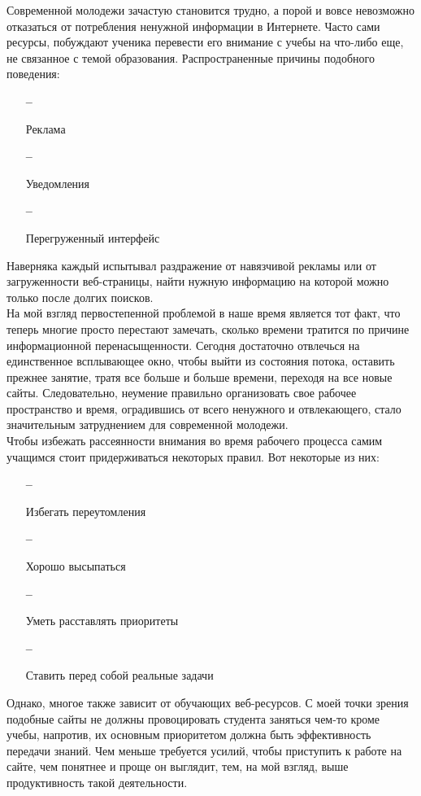 \documentclass[a4paper, 12pt]{extarticle}
\begin{document}
Современной молодежи зачастую становится трудно, а порой и вовсе невозможно
отказаться от потребления ненужной информации в Интернете. Часто сами ресурсы,
побуждают ученика перевести его внимание с учебы на что-либо еще, не связанное
с темой образования. Распространенные причины подобного поведения:
\begin{itemize}
    \item[\bfseries--] {\small Реклама\par}
    \item[\bfseries--] {\small Уведомления\par}
    \item[\bfseries--] {\small Перегруженный интерфейс\par}
\end{itemize}
Наверняка каждый испытывал раздражение от навязчивой рекламы или от
загруженности веб-страницы, найти нужную информацию на которой можно только
после долгих поисков.
\\

На мой взгляд первостепенной проблемой в наше время является тот факт, что
теперь многие просто перестают замечать, сколько времени тратится по причине
информационной перенасыщенности. Сегодня достаточно отвлечься на единственное
всплывающее окно, чтобы выйти из состояния потока, оставить прежнее занятие,
тратя все больше и больше времени, переходя на все новые сайты. Следовательно,
неумение правильно организовать свое рабочее пространство и время, оградившись от всего
ненужного и отвлекающего, стало значительным затруднением для современной
молодежи.
\\

Чтобы избежать рассеянности внимания во время рабочего процесса самим учащимся
стоит придерживаться некоторых правил. Вот некоторые из них:
\begin{itemize}
    \item[\bfseries--] {\small Избегать переутомления\par}
    \item[\bfseries--] {\small Хорошо высыпаться\par}
    \item[\bfseries--] {\small Уметь расставлять приоритеты\par}
    \item[\bfseries--] {\small Ставить перед собой реальные задачи\par}
\end{itemize}
Однако, многое также зависит от обучающих веб-ресурсов. С моей точки зрения
подобные сайты не должны провоцировать студента заняться чем-то кроме учебы,
напротив, их основным приоритетом должна быть эффективность передачи знаний.
Чем меньше требуется усилий, чтобы приступить к работе на сайте, чем понятнее и
проще он выглядит, тем, на мой взгляд, выше продуктивность такой деятельности.
\newpage
\end{document}
